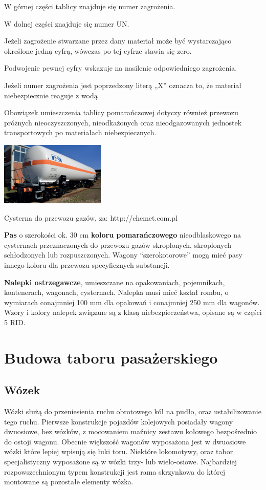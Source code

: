 W górnej części tablicy znajduje się numer zagrożenia.

W dolnej części znajduje się numer UN.

Jeżeli zagrożenie stwarzane przez dany materiał może być wystarczająco określone jedną cyfrą, wówczas po tej cyfrze stawia się zero.

Podwojenie pewnej cyfry wskazuje na nasilenie odpowiedniego zagrożenia.

Jeżeli numer zagrożenia jest poprzedzony literą „X” oznacza to, że materiał niebezpiecznie reaguje z wodą

Obowiązek umieszczenia tablicy pomarańczowej dotyczy również przewozu próżnych nieoczyszczonych, nieodkażonych oraz nieodgazowanych jednostek transportowych po materiałach niebezpiecznych.
\begin{marginfigure}
	\includegraphics[width=5cm]{skryptkierownik-img/cysterna-rid.jpg}
	\caption{Cysterna do przewozu gazów, za: http://chemet.com.pl}
	\label{fig:cysterna}
\end{marginfigure}
\textbf{Pas} o szerokości ok. 30 cm\textbf{ koloru pomarańczowego} nieodblaskowego na cysternach przeznaczonych do przewozu gazów skroplonych, skroplonych schłodzonych lub rozpuszczonych. Wagony “szerokotorowe” mogą mieć pasy innego koloru dla przewozu specyficznych substancji.

\textbf{Nalepki ostrzegawcze}, umieszczane na opakowaniach, pojemnikach, kontenerach, wagonach, cysternach. Nalepka musi mieć kształ rombu, o wymiarach conajmniej 100 mm dla opakowań i conajmniej 250 mm dla wagonów. Wzory i kolory nalepek
związane są z klasą niebezpieczeństwa, opisane są w części 5 RID.


\chapter{Budowa taboru pasażerskiego}
	\section{Wózek}

Wózki służą do przeniesienia ruchu obrotowego kół na pudło, oraz ustabilizowanie tego ruchu. Pierwsze konstrukcje pojazdów kolejowych posiadały wagony dwuosiowe, bez wózków, z mocowaniem maźnicy zestawu kołowego bezpośrednio do ostoji wagonu. Obecnie większość wagonów wyposażona jest w dwuosiowe wózki które lepiej wpisują się łuki toru. Niektóre lokomotywy, oraz tabor specjalistyczny wyposażone są w wózki trzy- lub wielo-osiowe. Najbardziej rozpowszechnionym typem konstrukcji jest rama skrzynkowa do której montowane są pozostałe elementy wózka.

